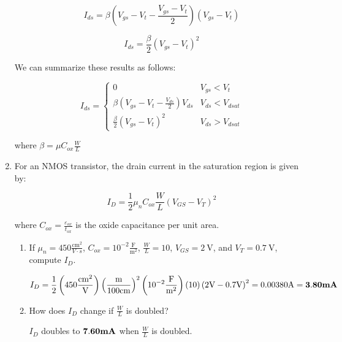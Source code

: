 \documentclass[fleqn]{article}
\begin{document}
\begin{enumerate}
		 \begin{equation*}		
			I_{ds} = \beta\left(V_{gs} - V_t - \frac{V_{gs} - V_t}{2}\right)\left(V_{gs} - V_t\right)
		\end{equation*}
		
		\begin{equation*}		
			I_{ds} = \frac{\beta}{2}\left(V_{gs} - V_t\right)^2
		\end{equation*}
		
		We can summarize these results as follows:
		
		\begin{equation*}
			I_{ds} = \begin{cases}
				0 & V_{gs} < V_t \\
				\beta\left(V_{gs}-V_t-\frac{V_{ds}}{2}\right)V_{ds} & V_{ds} < V_{dsat} \\
				\frac{\beta}{2}(V_{gs}-V_t)^2 & V_{ds} > V_{dsat}
			\end{cases}
		\end{equation*}
		
		where $\beta = \mu{C_{ox}}\frac{W}{L}$
		
		\item For an NMOS transistor, the drain current in the saturation region is given by:
		
		\begin{equation*}
			I_D = \frac{1}{2}{\mu_n}{C_{ox}}\frac{W}{L}(V_{GS}-V_{T})^2
		\end{equation*}
		
		where $C_{ox} = \frac{\varepsilon_{ox}}{t_{ox}}$ is the oxide capacitance per unit area.
		
		\begin{enumerate}
			\item If $\mu_n = 450 \frac{\text{cm}^2}{V \cdot s}$, $C_{ox} = 10^{-2}\frac{\text{F}}{\text{m}^2}$, $\frac{W}{L} = 10$, $V_{GS} = 2\ \text{V}$, and $V_T = 0.7\ \text{V}$, compute $I_D$.
			
			\begin{equation*}
				I_D = \frac{1}{2}\left(450\frac{\text{cm}^2}{\text{V}}\right)\left(\frac{\text{m}}{100\text{cm}}\right)^2\left(10^{-2}\frac{\text{F}}{\text{m}^2}\right)(10)\left(2\text{V} - 0.7\text{V}\right)^2 = 0.00380 \text{A} = \mathbf{3.80 \textbf{\text{mA}}}
			\end{equation*}
			
			\item How does $I_D$ change if $\frac{W}{L}$ is doubled?
			
			$I_D$ doubles to $\mathbf{7.60 \text{\textbf{mA}}}$ when $\frac{W}{L}$ is doubled.
			

\end{enumerate}
\end{enumerate}
\end{document}
